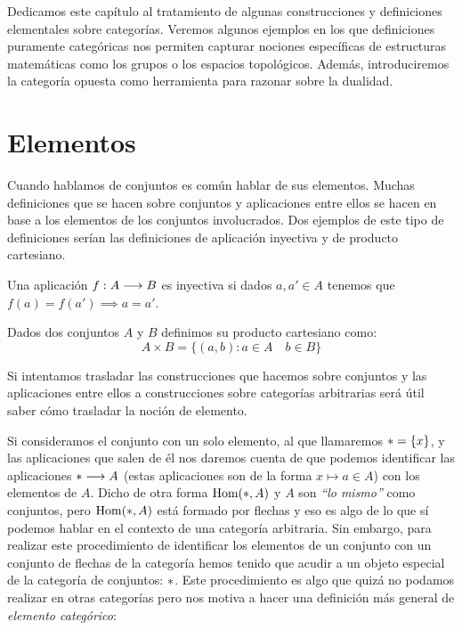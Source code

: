 Dedicamos este capítulo al tratamiento de
algunas construcciones y definiciones elementales
sobre categorías. Veremos algunos ejemplos en los que
definiciones puramente categóricas nos permiten capturar nociones
específicas de estructuras matemáticas como los grupos o los
espacios topológicos. Además, introduciremos la categoría opuesta
como herramienta para razonar sobre la dualidad.

\section{Elementos}
Cuando hablamos de conjuntos es común hablar de sus elementos. Muchas
definiciones que se hacen sobre conjuntos y aplicaciones entre
ellos se hacen en base a los elementos de los conjuntos involucrados.
Dos ejemplos de este tipo de definiciones serían las definiciones de
aplicación inyectiva y de producto cartesiano.

\begin{definition*}
Una aplicación $f : A\longrightarrow B$ es inyectiva si dados
$a, a' \in A$ tenemos que $f(a) = f(a') \implies a = a'$.
\end{definition*}

\begin{definition*}
Dados dos conjuntos $A$ y $B$ definimos su producto cartesiano
como:
$$A\times B = \{ (a, b) : a \in A \quad b \in B \}$$
\end{definition*}

Si intentamos trasladar las construcciones que hacemos sobre
conjuntos y las aplicaciones entre ellos
a construcciones sobre categorías arbitrarias
será útil saber cómo trasladar la noción de elemento.

Si consideramos el conjunto con un solo elemento, al que llamaremos
$* = \{ x \}$, y las aplicaciones que
salen de él nos daremos cuenta de que podemos
identificar las aplicaciones $*\longrightarrow A$
(estas aplicaciones son de la forma $x \mapsto a \in A$)
con los elementos
de $A$. Dicho de otra forma $\operatorname{Hom}(*, A)$ y $A$ son
\emph{``lo mismo''} como conjuntos,
pero $\operatorname{Hom}(*, A)$ está formado por flechas y eso es algo de lo que
sí podemos hablar en el contexto de una categoría
arbitraria. Sin embargo, para realizar
este procedimiento de identificar los elementos de un conjunto con
un conjunto de flechas de la categoría hemos tenido que acudir a un
objeto especial de la categoría de conjuntos: $*$. Este procedimiento
es algo que quizá no podamos realizar en otras categorías pero nos
motiva a hacer una definición más general de
\textit{elemento categórico}:

